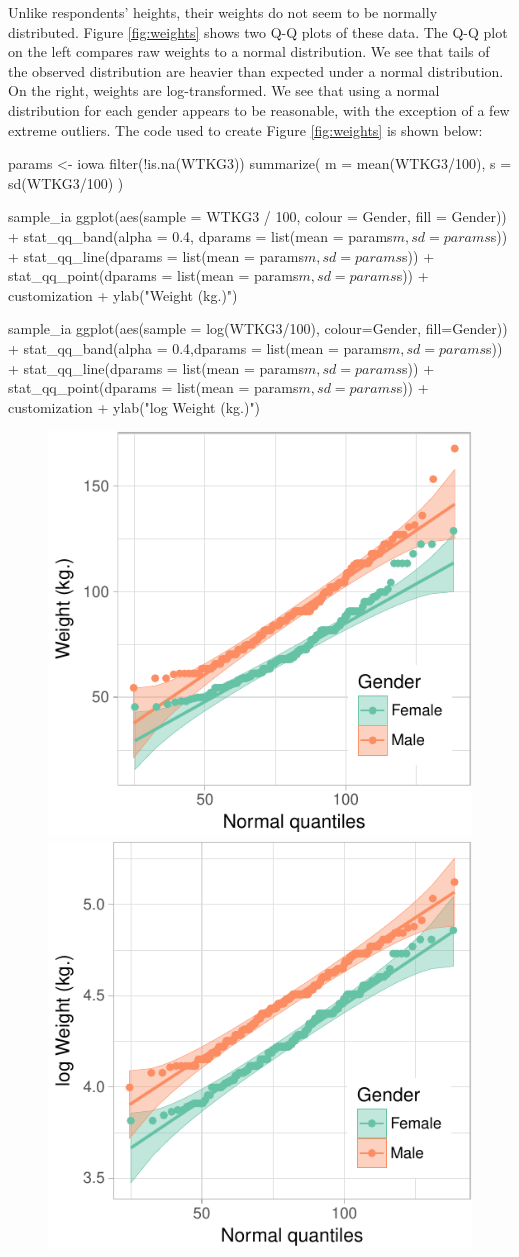 Unlike respondents' heights, their weights do not seem to be normally
distributed. Figure \ref{fig:weights} shows two Q-Q plots of these data.
The Q-Q plot on the left compares raw weights to a normal distribution.
We see that tails of the observed distribution are heavier than expected
under a normal distribution. On the right, weights are log-transformed.
We see that using a normal distribution for each gender appears to be
reasonable, with the exception of a few extreme outliers. The code used
to create Figure \ref{fig:weights} is shown below:

\begin{Schunk}
\begin{Sinput}
params <- iowa %
  filter(!is.na(WTKG3)) %
  summarize(
    m = mean(WTKG3/100),
    s = sd(WTKG3/100)
  )

sample_ia %
  ggplot(aes(sample = WTKG3 / 100, colour = Gender, fill = Gender)) + 
  stat_qq_band(alpha = 0.4,
               dparams = list(mean = params$m, sd = params$s)) + 
  stat_qq_line(dparams = list(mean = params$m, sd = params$s)) + 
  stat_qq_point(dparams = list(mean = params$m, sd = params$s)) +
  customization +
  ylab("Weight (kg.)")

sample_ia %
  ggplot(aes(sample = log(WTKG3/100), colour=Gender, fill=Gender)) + 
  stat_qq_band(alpha = 0.4,dparams = list(mean = params$m, sd = params$s)) + 
  stat_qq_line(dparams = list(mean = params$m, sd = params$s)) + 
  stat_qq_point(dparams = list(mean = params$m, sd = params$s)) +
  customization +
  ylab("log Weight (kg.)")
\end{Sinput}
\begin{figure}

{\centering \includegraphics[width=0.4\linewidth]{loy-figures/weights-1} \includegraphics[width=0.4\linewidth]{loy-figures/weights-2} 

}
\end{figure}
\end{Schunk}
